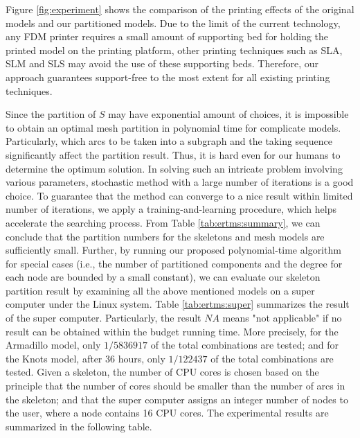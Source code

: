 Figure \ref{fig:experiment} shows the comparison of the printing effects of the original models and our partitioned models. Due to the limit of the current technology, any FDM printer requires a small amount of supporting bed for holding the printed model on the printing platform, other printing techniques such as SLA, SLM and SLS may avoid the use of these supporting beds. Therefore, our approach guarantees support-free to the most extent for all existing printing techniques.

Since the partition of $S$ may have exponential amount of choices, it is impossible to obtain an optimal mesh partition in polynomial time for complicate models. Particularly, which arcs to be taken into a subgraph and the taking sequence significantly affect the partition result. Thus, it is hard even for our humans to determine the optimum solution. In solving such an intricate problem involving various parameters, stochastic method with a large number of iterations is a good choice. To guarantee that the method can converge to a nice result within limited number of iterations, we apply a training-and-learning procedure, which helps accelerate the searching process. From Table \ref{tab:ertms:summary}, we can conclude that the partition numbers for the skeletons and mesh models are sufficiently small. Further, by running our proposed polynomial-time algorithm for special cases (i.e., the number of partitioned components and the degree for each node are bounded by a small constant), we can evaluate our skeleton partition result by examining all the above mentioned models on a super computer under the Linux system. Table \ref{tab:ertms:super} summarizes the result of the super computer. Particularly, the result $NA$ means "not applicable" if no result can be obtained within the budget running time. More precisely, for the Armadillo model, only $1/5836917$ of the total combinations are tested; and for the Knots model, after 36 hours, only $1/122437$ of the total combinations are tested. Given a skeleton, the number of CPU cores is chosen based on the principle that the number of cores should be smaller than the number of arcs in the skeleton; and that the super computer assigns an integer number of nodes to the user, where a node contains 16 CPU cores. The experimental results are summarized in the following table.

